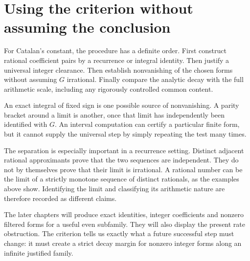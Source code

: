 \section{Using the criterion without assuming the conclusion}

For Catalan's constant, the procedure has a definite order. First construct rational coefficient pairs by a recurrence or integral identity. Then justify a universal integer clearance. Then establish nonvanishing of the chosen forms without assuming $G$ irrational. Finally compare the analytic decay with the full arithmetic scale, including any rigorously controlled common content.

An exact integral of fixed sign is one possible source of nonvanishing. A parity bracket around a limit is another, once that limit has independently been identified with $G$. An interval computation can certify a particular finite form, but it cannot supply the universal step by simply repeating the test many times.

The separation is especially important in a recurrence setting. Distinct adjacent rational approximants prove that the two sequences are independent. They do not by themselves prove that their limit is irrational. A rational number can be the limit of a strictly monotone sequence of distinct rationals, as the examples above show. Identifying the limit and classifying its arithmetic nature are therefore recorded as different claims.

The later chapters will produce exact identities, integer coefficients and nonzero filtered forms for a useful even subfamily. They will also display the present rate obstruction. The criterion tells us exactly what a future successful step must change: it must create a strict decay margin for nonzero integer forms along an infinite justified family.

